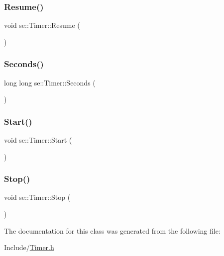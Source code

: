 \mbox{\label{classse_1_1_timer_a432406f463e02336c1033d65ae1d746e}} 
\subsubsection{\texorpdfstring{Resume()}{Resume()}}
{\footnotesize\ttfamily void se\+::\+Timer\+::\+Resume (\begin{DoxyParamCaption}{ }\end{DoxyParamCaption})}

\mbox{\label{classse_1_1_timer_a258761c48271338588503d8170532bde}} 
\subsubsection{\texorpdfstring{Seconds()}{Seconds()}}
{\footnotesize\ttfamily long long se\+::\+Timer\+::\+Seconds (\begin{DoxyParamCaption}{ }\end{DoxyParamCaption})}

\mbox{\label{classse_1_1_timer_a0294f5629a28a1e169a8d1b5ab179273}} 
\subsubsection{\texorpdfstring{Start()}{Start()}}
{\footnotesize\ttfamily void se\+::\+Timer\+::\+Start (\begin{DoxyParamCaption}{ }\end{DoxyParamCaption})}

\mbox{\label{classse_1_1_timer_aed6b34f75ec989731c80fefe962493f3}} 
\subsubsection{\texorpdfstring{Stop()}{Stop()}}
{\footnotesize\ttfamily void se\+::\+Timer\+::\+Stop (\begin{DoxyParamCaption}{ }\end{DoxyParamCaption})}



The documentation for this class was generated from the following file\+:\begin{DoxyCompactItemize}
\item 
Include/\mbox{\hyperlink{_timer_8h}{Timer.\+h}}\end{DoxyCompactItemize}
